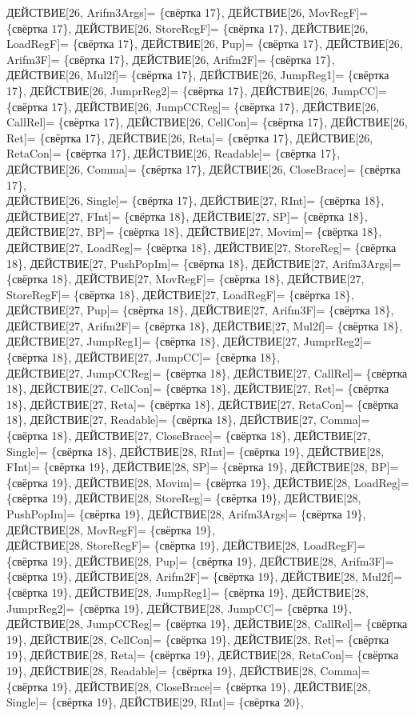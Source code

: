 \documentclass[a0]{a0poster}
\begin{document}
ДЕЙСТВИЕ[26, Arifm3Args]= \{свёртка 17\}, ДЕЙСТВИЕ[26, MovRegF]= \{свёртка 17\}, ДЕЙСТВИЕ[26, StoreRegF]= \{свёртка 17\}, ДЕЙСТВИЕ[26, LoadRegF]= \{свёртка 17\}, ДЕЙСТВИЕ[26, Pup]= \{свёртка 17\}, ДЕЙСТВИЕ[26, Arifm3F]= \{свёртка 17\}, ДЕЙСТВИЕ[26, Arifm2F]= \{свёртка 17\}, ДЕЙСТВИЕ[26, Mul2f]= \{свёртка 17\}, ДЕЙСТВИЕ[26, JumpReg1]= \{свёртка 17\}, ДЕЙСТВИЕ[26, JumprReg2]= \{свёртка 17\}, ДЕЙСТВИЕ[26, JumpCC]= \{свёртка 17\}, ДЕЙСТВИЕ[26, JumpCCReg]= \{свёртка 17\}, ДЕЙСТВИЕ[26, CallRel]= \{свёртка 17\}, ДЕЙСТВИЕ[26, CellCon]= \{свёртка 17\}, ДЕЙСТВИЕ[26, Ret]= \{свёртка 17\}, ДЕЙСТВИЕ[26, Reta]= \{свёртка 17\}, ДЕЙСТВИЕ[26, RetaCon]= \{свёртка 17\}, ДЕЙСТВИЕ[26, Readable]= \{свёртка 17\}, ДЕЙСТВИЕ[26, Comma]= \{свёртка 17\}, ДЕЙСТВИЕ[26, CloseBrace]= \{свёртка 17\}, \\
ДЕЙСТВИЕ[26, Single]= \{свёртка 17\}, ДЕЙСТВИЕ[27, RInt]= \{свёртка 18\}, ДЕЙСТВИЕ[27, FInt]= \{свёртка 18\}, ДЕЙСТВИЕ[27, SP]= \{свёртка 18\}, ДЕЙСТВИЕ[27, BP]= \{свёртка 18\}, ДЕЙСТВИЕ[27, Movim]= \{свёртка 18\}, ДЕЙСТВИЕ[27, LoadReg]= \{свёртка 18\}, ДЕЙСТВИЕ[27, StoreReg]= \{свёртка 18\}, ДЕЙСТВИЕ[27, PushPopIm]= \{свёртка 18\}, ДЕЙСТВИЕ[27, Arifm3Args]= \{свёртка 18\}, ДЕЙСТВИЕ[27, MovRegF]= \{свёртка 18\}, ДЕЙСТВИЕ[27, StoreRegF]= \{свёртка 18\}, ДЕЙСТВИЕ[27, LoadRegF]= \{свёртка 18\}, ДЕЙСТВИЕ[27, Pup]= \{свёртка 18\}, ДЕЙСТВИЕ[27, Arifm3F]= \{свёртка 18\}, ДЕЙСТВИЕ[27, Arifm2F]= \{свёртка 18\}, ДЕЙСТВИЕ[27, Mul2f]= \{свёртка 18\}, ДЕЙСТВИЕ[27, JumpReg1]= \{свёртка 18\}, ДЕЙСТВИЕ[27, JumprReg2]= \{свёртка 18\}, ДЕЙСТВИЕ[27, JumpCC]= \{свёртка 18\}, \\
ДЕЙСТВИЕ[27, JumpCCReg]= \{свёртка 18\}, ДЕЙСТВИЕ[27, CallRel]= \{свёртка 18\}, ДЕЙСТВИЕ[27, CellCon]= \{свёртка 18\}, ДЕЙСТВИЕ[27, Ret]= \{свёртка 18\}, ДЕЙСТВИЕ[27, Reta]= \{свёртка 18\}, ДЕЙСТВИЕ[27, RetaCon]= \{свёртка 18\}, ДЕЙСТВИЕ[27, Readable]= \{свёртка 18\}, ДЕЙСТВИЕ[27, Comma]= \{свёртка 18\}, ДЕЙСТВИЕ[27, CloseBrace]= \{свёртка 18\}, ДЕЙСТВИЕ[27, Single]= \{свёртка 18\}, ДЕЙСТВИЕ[28, RInt]= \{свёртка 19\}, ДЕЙСТВИЕ[28, FInt]= \{свёртка 19\}, ДЕЙСТВИЕ[28, SP]= \{свёртка 19\}, ДЕЙСТВИЕ[28, BP]= \{свёртка 19\}, ДЕЙСТВИЕ[28, Movim]= \{свёртка 19\}, ДЕЙСТВИЕ[28, LoadReg]= \{свёртка 19\}, ДЕЙСТВИЕ[28, StoreReg]= \{свёртка 19\}, ДЕЙСТВИЕ[28, PushPopIm]= \{свёртка 19\}, ДЕЙСТВИЕ[28, Arifm3Args]= \{свёртка 19\}, ДЕЙСТВИЕ[28, MovRegF]= \{свёртка 19\}, \\
ДЕЙСТВИЕ[28, StoreRegF]= \{свёртка 19\}, ДЕЙСТВИЕ[28, LoadRegF]= \{свёртка 19\}, ДЕЙСТВИЕ[28, Pup]= \{свёртка 19\}, ДЕЙСТВИЕ[28, Arifm3F]= \{свёртка 19\}, ДЕЙСТВИЕ[28, Arifm2F]= \{свёртка 19\}, ДЕЙСТВИЕ[28, Mul2f]= \{свёртка 19\}, ДЕЙСТВИЕ[28, JumpReg1]= \{свёртка 19\}, ДЕЙСТВИЕ[28, JumprReg2]= \{свёртка 19\}, ДЕЙСТВИЕ[28, JumpCC]= \{свёртка 19\}, ДЕЙСТВИЕ[28, JumpCCReg]= \{свёртка 19\}, ДЕЙСТВИЕ[28, CallRel]= \{свёртка 19\}, ДЕЙСТВИЕ[28, CellCon]= \{свёртка 19\}, ДЕЙСТВИЕ[28, Ret]= \{свёртка 19\}, ДЕЙСТВИЕ[28, Reta]= \{свёртка 19\}, ДЕЙСТВИЕ[28, RetaCon]= \{свёртка 19\}, ДЕЙСТВИЕ[28, Readable]= \{свёртка 19\}, ДЕЙСТВИЕ[28, Comma]= \{свёртка 19\}, ДЕЙСТВИЕ[28, CloseBrace]= \{свёртка 19\}, ДЕЙСТВИЕ[28, Single]= \{свёртка 19\}, ДЕЙСТВИЕ[29, RInt]= \{свёртка 20\}, \\
\end{document}

